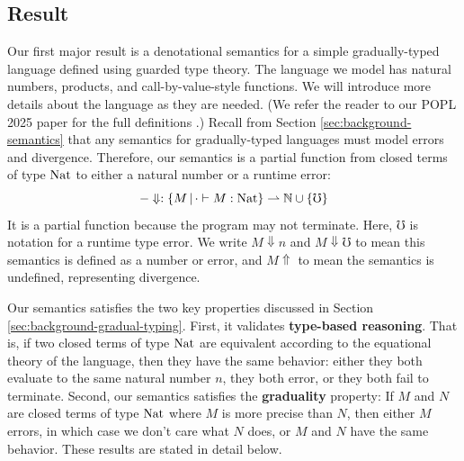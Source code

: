 \documentclass{article}
\theoremstyle{definition}
\theoremstyle{remark}
\begin{document}

\subsection{Result}


Our first major result is a denotational semantics for a simple gradually-typed
language defined using guarded type theory. The language we model has natural
numbers, products, and call-by-value-style functions. We will introduce more
details about the language as they are needed. (We refer the reader to our POPL
2025 paper for the full definitions \cite{gtt-sgdt}.) Recall from Section
\ref{sec:background-semantics} that any semantics for gradually-typed languages
must model errors and divergence. Therefore, our semantics is a partial function
from closed terms of type $\text{Nat}$ to either a natural number or a runtime error:
%
\[ -\Downarrow : \{M \,|\, \cdot \vdash M : \text{Nat} \} \rightharpoonup \mathbb{N}
\cup \{\mho\} \] 
%
It is a partial function because the program may not terminate. Here, $\mho$ is
notation for a runtime type error. We write $M \Downarrow n$ and $M\Downarrow
\mho$ to mean this semantics is defined as a number or error, and $M\Uparrow$ to
mean the semantics is undefined, representing divergence.

Our semantics satisfies the two key properties discussed in Section
\ref{sec:background-gradual-typing}. First, it validates \textbf{type-based
reasoning}. That is, if two closed terms of type $\text{Nat}$ are equivalent according
to the equational theory of the language, then they have the same behavior:
either they both evaluate to the same natural number $n$, they both error, or
they both fail to terminate.
%
Second, our semantics satisfies the \textbf{graduality} property: If $M$ and $N$
are closed terms of type $\text{Nat}$ where $M$ is more precise than $N$, then either
$M$ errors, in which case we don't care what $N$ does, or $M$ and $N$ have the
same behavior. These results are stated in detail below.
\end{document}

